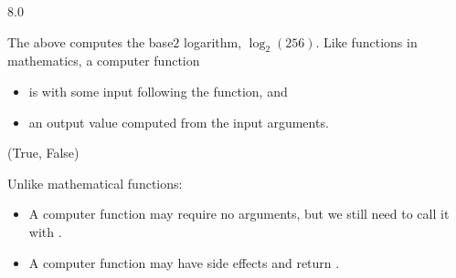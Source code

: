 \documentclass[letterpaper,10pt,english]{sphinxmanual}
\begin{document}
\begin{sphinxVerbatim}[commandchars=\\\{\}]
   
   
\end{sphinxVerbatim}

\begin{sphinxVerbatim}[commandchars=\\\{\}]
8.0
\end{sphinxVerbatim}

The above computes the base\sphinxhyphen{}\(2\) logarithm, \(\log_2(256)\). Like functions in mathematics, a computer function 
\begin{itemize}
\item {} 
is  with some input   following the function, and

\item {} 
 an output value computed from the input arguments.

\end{itemize}

\begin{sphinxVerbatim}[commandchars=\\\{\}]
 
\end{sphinxVerbatim}

\begin{sphinxVerbatim}[commandchars=\\\{\}]
(True, False)
\end{sphinxVerbatim}

Unlike mathematical functions:
\begin{itemize}
\item {} 
A computer function may require no arguments, but we still need to call it with \sphinxcode{\sphinxupquote{()}}.

\end{itemize}

\begin{sphinxVerbatim}[commandchars=\\\{\}]
\end{sphinxVerbatim}
\begin{itemize}
\item {} 
A computer function may have side effects and return .

\end{itemize}
\end{document}
